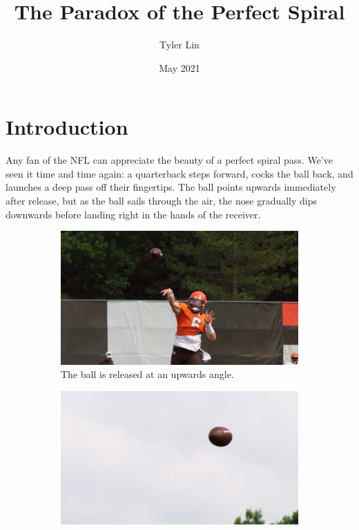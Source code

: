 \documentclass{article}
\title{The Paradox of the Perfect Spiral}
\author{Tyler Lin}
\date{May 2021}
\begin{document}
\maketitle

\section{Introduction}
Any fan of the NFL can appreciate the beauty of a perfect spiral pass. We've seen it time and time again: a quarterback steps forward, cocks the ball back, and launches a deep pass off their fingertips. The ball points upwards immediately after release, but as the ball sails through the air, the nose gradually dips downwards before landing right in the hands of the receiver.

\begin{figure}[h]
     \begin{subfigure}[b]{0.3\textwidth}
         \includegraphics[width=\textwidth]{img/throw.png}
         \caption{The ball is released at an upwards angle.}
     \end{subfigure}
     \hfill
     \begin{subfigure}[b]{0.3\textwidth}
         \includegraphics[width=\textwidth]{img/peak.png}

\end{subfigure}
\end{figure}
\end{document}
